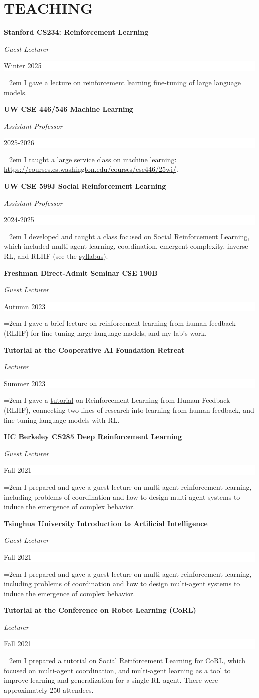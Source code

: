 \documentclass[paper=letter,fontsize=11pt]{scrartcl} %
\newcommand{\sepspace}{\vspace*{1em}}		%
\newcommand{\NewPart}[2]{\section*{\uppercase{#1} #2}}
\newcommand{\CourseEntry}[4]{
		\noindent \textbf{#1} \par
		\noindent \textit{#3} \hfill      %
		\colorbox{White}{%
			\parbox{6em}{%
			\hfill\color{Black}#2}} \par  %
		\noindent\hangindent=2em\hangafter=0 \small #4 %
		\normalsize \par}
\begin{document}
\NewPart{Teaching}{}
\CourseEntry{Stanford CS234: Reinforcement Learning}{Winter 2025}{Guest Lecturer}
{I gave a \href{https://www.youtube.com/watch?v=NTSYgbwBVaY&t=2s&ab_channel=NatashaJaques}{lecture} on reinforcement learning fine-tuning of large language models.}
\sepspace

\CourseEntry{UW CSE 446/546 Machine Learning}{2025-2026}{Assistant Professor}
{I taught a large service class on machine learning:  \url{https://courses.cs.washington.edu/courses/cse446/25wi/}.}
\sepspace

\CourseEntry{UW CSE 599J Social Reinforcement Learning}{2024-2025}{Assistant Professor}
{I developed and taught a class focused on \href{https://courses.cs.washington.edu/courses/cse599j/24sp/}{Social Reinforcement Learning}, which included multi-agent learning, coordination, emergent complexity, inverse RL, and RLHF (see the \href{https://docs.google.com/spreadsheets/d/15-ERP_wOeHLU8adFOVFSxMeUonjSdCqdvJ-OFJIMhWM/edit?gid=0#gid=0}{syllabus}).}
\sepspace

\CourseEntry{Freshman Direct-Admit Seminar CSE 190B}{Autumn 2023}{Guest Lecturer}
{I gave a brief lecture on reinforcement learning from human feedback (RLHF) for fine-tuning large language models, and my lab's work.}
\sepspace

\CourseEntry{Tutorial at the Cooperative AI Foundation Retreat}{Summer 2023}{ Lecturer}
{I gave a \href{https://www.youtube.com/watch?v=56PlUikhB3o&list=PL4gbzAVOpp7AN4mYx7-KQN-T1Zv82uNu-&index=3}{tutorial} on Reinforcement Learning from Human Feedback (RLHF), connecting two lines of research into learning from human feedback, and fine-tuning language models with RL.}
\sepspace

\CourseEntry{UC Berkeley CS285 Deep Reinforcement Learning}{Fall 2021}{Guest Lecturer}
{I prepared and gave a guest lecture on multi-agent reinforcement learning, including problems of coordination and how to design multi-agent systems to induce the emergence of complex behavior.}
\sepspace

\CourseEntry{Tsinghua University Introduction to Artificial Intelligence}{Fall 2021}{Guest Lecturer}
{I prepared and gave a guest lecture on multi-agent reinforcement learning, including problems of coordination and how to design multi-agent systems to induce the emergence of complex behavior.}
\sepspace

\CourseEntry{Tutorial at the Conference on Robot Learning (CoRL)}{Fall 2021}{Lecturer}
{I prepared a tutorial on Social Reinforcement Learning for CoRL, which focused on multi-agent coordination, and multi-agent learning as a tool to improve learning and generalization for a single RL agent. There were approximately 250 attendees.}
\sepspace
\end{document}

